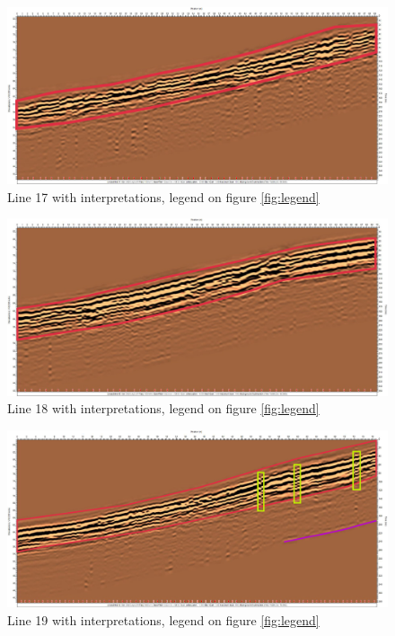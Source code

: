 \begin{figure}[p]
    \centering
    \includegraphics[width=\linewidth]{Images/00_Results/line17_edited.jpg}
    \caption{Line 17 with interpretations, legend on  figure \ref{fig:legend}}
    \label{fig:line17}
\end{figure}

\begin{figure}[p]
    \centering
    \includegraphics[width=\linewidth]{Images/00_Results/line18_edited.jpg}
    \caption{Line 18 with interpretations, legend on figure \ref{fig:legend}}
    \label{fig:line18}
\end{figure}

\begin{figure}[p]
    \centering
    \includegraphics[width=\linewidth]{Images/00_Results/line19_edited.jpg}
    \caption{Line 19 with interpretations, legend on figure \ref{fig:legend}}
    \label{fig:line19}
\end{figure}

